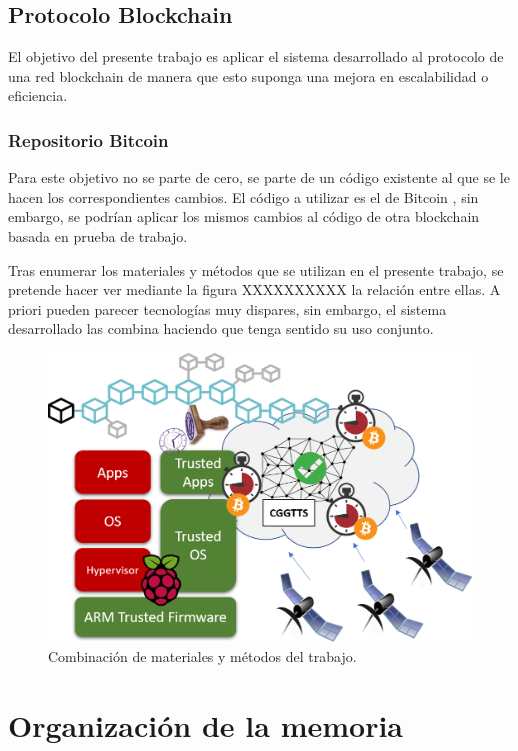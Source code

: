 \subsection{Protocolo Blockchain}
El objetivo del presente trabajo es aplicar el sistema desarrollado al protocolo de una red blockchain de manera que esto suponga una mejora en escalabilidad o eficiencia.

\subsubsection{Repositorio Bitcoin}
Para este objetivo no se parte de cero, se parte de un código existente al que se le hacen los correspondientes cambios. El código a utilizar es el de Bitcoin \cite{bitcoincode}, sin embargo, se podrían aplicar los mismos cambios al código de otra blockchain basada en prueba de trabajo. \newline


Tras enumerar los materiales y métodos que se utilizan en el presente trabajo, se pretende hacer ver mediante la figura XXXXXXXXXX la relación entre ellas. A priori pueden parecer tecnologías muy dispares, sin embargo, el sistema desarrollado las combina haciendo que tenga sentido su uso conjunto.


\begin{figure}
	\centering
	\includegraphics[width=1\textwidth]{imagenes/Imagen2.png}
	\caption{\label{fig1}Combinación de materiales y métodos del trabajo.}
\end{figure}





\section{Organización de la memoria}